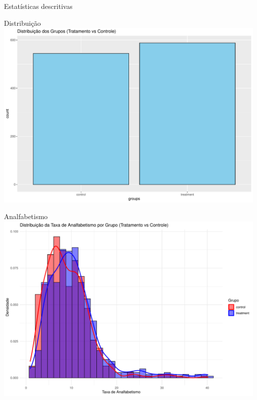 \documentclass[
  ignorenonframetext,
]{beamer}
\begin{document}
\begin{frame}{Estatísticas descritivas}
\label{estatuxedsticas-descritivas}
\end{frame}

\begin{frame}{Distribuição}
\label{distribuiuxe7uxe3o}
\includegraphics{graficos_files/figure-beamer/unnamed-chunk-8-1.pdf}
\end{frame}

\begin{frame}{Analfabetismo}
\label{analfabetismo}
\includegraphics{graficos_files/figure-beamer/unnamed-chunk-9-1.pdf}
\end{frame}
\end{document}
